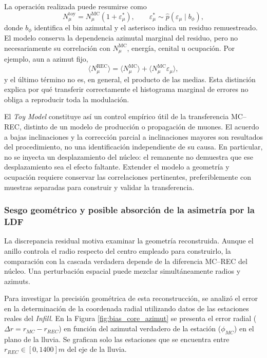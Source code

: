 La operación realizada puede resumirse como
\begin{equation}
N_\mu^{\mathrm{toy}}=N_\mu^{\mathrm{MC}}(1+\varepsilon_\mu^\ast),
\qquad
\varepsilon_\mu^\ast\sim \widehat p(\varepsilon_\mu\mid b_\phi),
\label{eq:dense2026_transferencia}
\end{equation}
donde $b_\phi$ identifica el bin azimutal y el asterisco indica un residuo remuestreado. El modelo conserva la dependencia azimutal marginal del residuo, pero no necesariamente su correlación con $N_\mu^{\mathrm{MC}}$, energía, cenital u ocupación. Por ejemplo, aun a azimut fijo,
\begin{equation}
\langle N_\mu^{\mathrm{REC}}\rangle
=\langle N_\mu^{\mathrm{MC}}\rangle
+\langle N_\mu^{\mathrm{MC}}\varepsilon_\mu\rangle,
\label{eq:dense2026_media_residuo}
\end{equation}
y el último término no es, en general, el producto de las medias. Esta distinción explica por qué transferir correctamente el histograma marginal de errores no obliga a reproducir toda la modulación.

El \textit{Toy Model} constituye así un control empírico útil de la transferencia MC--REC, distinto de un modelo de producción o propagación de muones. El acuerdo a bajas inclinaciones y la corrección parcial a inclinaciones mayores son resultados del procedimiento, no una identificación independiente de su causa. En particular, no se inyecta un desplazamiento del núcleo: el remanente no demuestra que ese desplazamiento sea el efecto faltante. Extender el modelo a geometría y ocupación requiere conservar las correlaciones pertinentes, preferiblemente con muestras separadas para construir y validar la transferencia.

\subsubsection{Sesgo geométrico y posible absorción de la asimetría por la LDF}
\label{subsec:dense2026_nucleo}

La discrepancia residual motiva examinar la geometría reconstruida. Aunque el anillo controla el radio respecto del centro empleado para construirlo, la comparación con la cascada verdadera depende de la diferencia MC--REC del núcleo. Una perturbación espacial puede mezclar simultáneamente radios y azimuts.

Para investigar la precisión geométrica de esta reconstrucción, se analizó el error en la determinación de la coordenada radial utilizando datos de las estaciones reales del \textit{Infill}. En la Figura \ref{fig:bias_core_azimut} se presenta el error radial ($\Delta r = r_{MC} - r_{REC}$) en función del azimutal verdadero de la estación ($\phi_{MC}$) en el plano de la lluvia. Se grafican solo las estaciones que se encuentra entre $r_{REC} \in [0,1400]m$ del eje de la lluvia.

